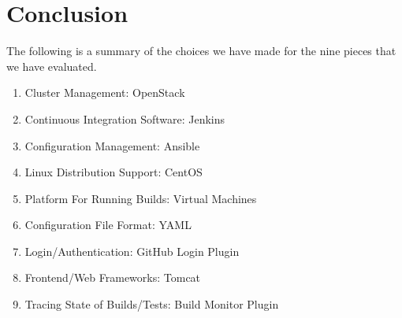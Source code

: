 \documentclass[10pt,letterpaper,onecolumn,journal]{IEEEtran}
\begin{document}
\section{Conclusion}
The following is a summary of the choices we have made for the nine pieces that we have evaluated.\\
\begin{enumerate}
  \item Cluster Management: OpenStack
  \item Continuous Integration Software: Jenkins
  \item Configuration Management: Ansible
  \item Linux Distribution Support: CentOS
  \item Platform For Running Builds: Virtual Machines
  \item Configuration File Format: YAML
  \item Login/Authentication: GitHub Login Plugin
  \item Frontend/Web Frameworks: Tomcat
  \item Tracing State of Builds/Tests: Build Monitor Plugin
\end{enumerate}
\clearpage


\end{document}
